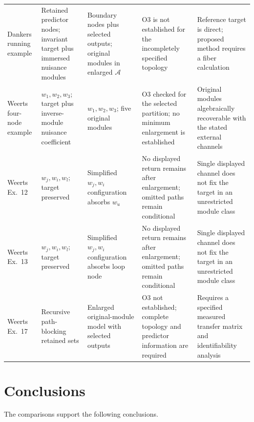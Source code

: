 \documentclass[11pt,a4paper]{article}
\newcommand{\Aset}{\mathcal A}
\begin{document}
\begin{longtable}{@{}p{}p{}p{}p{}p{}@{}}
\addlinespace
Dankers running example
& Retained predictor nodes; invariant target plus immersed nuisance modules
& Boundary nodes plus selected outputs; original modules in enlarged $\Aset$
& O3 is not established for the incompletely specified topology
& Reference target is direct; proposed method requires a fiber calculation \\
\addlinespace
Weerts four-node example
& $w_1,w_2,w_3$; target plus inverse-module nuisance coefficient
& $w_1,w_2,w_3$; five original modules
& O3 checked for the selected partition; no minimum enlargement is established
& Original modules algebraically recoverable with the stated external channels \\
\addlinespace
Weerts Ex.~12
& $w_j,w_i,w_l$; target preserved
& Simplified $w_j,w_i$ configuration absorbs $w_u$
& No displayed return remains after enlargement; omitted paths remain conditional
& Single displayed channel does not fix the target in an unrestricted module class \\
\addlinespace
Weerts Ex.~13
& $w_j,w_i,w_l$; target preserved
& Simplified $w_j,w_i$ configuration absorbs loop node
& No displayed return remains after enlargement; omitted paths remain conditional
& Single displayed channel does not fix the target in an unrestricted module class \\
\addlinespace
Weerts Ex.~17
& Recursive path-blocking retained sets
& Enlarged original-module model with selected outputs
& O3 not established; complete topology and predictor information are required
& Requires a specified measured transfer matrix and identifiability analysis \\
\end{longtable}
\normalsize

\section{Conclusions}

The comparisons support the following conclusions.
\end{document}
